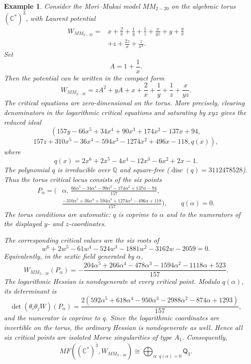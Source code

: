 \documentclass[11pt]{amsart}
\newtheorem{example}{Example}[section]
\newcommand{\MorseCat}[1]{\mathsf{Q}_{#1}}
\begin{document}
\begin{example}
Consider the Mori--Mukai model $MM_{2-20}$ on the algebraic torus
$(\mathbb{C}^*)^3$, with Laurent potential
\begin{align*}
W_{MM_{2-20}}={}&x+\frac{2}{x}+\frac{1}{y}+\frac{1}{z}
+\frac{x}{yz}+y+\frac{y}{x} \\
&+z+\frac{2z}{x}+\frac{z}{x^2}.
\end{align*}
Set
\[
A=1+\frac{1}{x}.
\]
Then the potential can be written in the compact form
\[
W_{MM_{2-20}}
=zA^2+yA+x+\frac{2}{x}+\frac{1}{y}+\frac{1}{z}+\frac{x}{yz}.
\]
The critical equations are zero-dimensional on the torus. More precisely,
clearing denominators in the logarithmic critical equations and saturating by
$xyz$ gives the reduced ideal
\[
\left(
157y-66x^5+34x^4+90x^3+174x^2-137x+94,
\right.
\]
\[
\left.
157z+310x^5-36x^4-594x^3-1274x^2+496x-118,
q(x)
\right),
\]
where
\[
q(x)=2x^6+2x^5-4x^4-12x^3-6x^2+2x-1.
\]
The polynomial $q$ is irreducible over $\mathbb{Q}$ and square-free
($\operatorname{disc}(q)=3112478528$). Thus the torus critical locus consists
of the six points
\[
\begin{aligned}
P_{\alpha}
=\biggl(&\alpha,\,
\frac{66\alpha^5-34\alpha^4-90\alpha^3-174\alpha^2+137\alpha-94}{157},\\
&\frac{-310\alpha^5+36\alpha^4+594\alpha^3+1274\alpha^2-496\alpha+118}{157}
\biggr),
\qquad q(\alpha)=0.
\end{aligned}
\]
The torus conditions are automatic: $q$ is coprime to
$\alpha$ and to the numerators of the displayed $y$- and $z$-coordinates.

The corresponding critical values are the six roots of
\[
w^6+2w^5-61w^4-524w^3-1881w^2-3162w-2059=0.
\]
Equivalently, in the sextic field generated by $\alpha$,
\[
W_{MM_{2-20}}(P_{\alpha})
=-\frac{204\alpha^5+266\alpha^4-478\alpha^3-1594\alpha^2-1118\alpha+523}{157}.
\]
The logarithmic Hessian is nondegenerate at every critical point. Modulo
$q(\alpha)$, its determinant is
\[
\det(\theta_i\theta_jW)(P_{\alpha})
=\frac{2(592\alpha^5+618\alpha^4-950\alpha^3-2988\alpha^2-874\alpha+1293)}{157},
\]
and the numerator is coprime to $q$. Since the logarithmic coordinates are
invertible on the torus, the ordinary Hessian is nondegenerate as well. Hence
all six critical points are isolated Morse singularities of type $A_1$.
Consequently,
\[
\overline{MF((\mathbb{C}^*)^3,W_{MM_{2-20}})}
\cong \bigoplus_{\alpha:\,q(\alpha)=0}\MorseCat{3}.
\]
\end{example}
\end{document}
